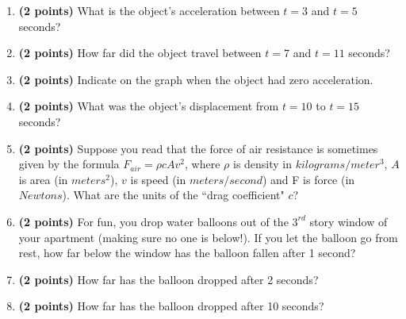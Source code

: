 \documentclass[10pt]{article}
\begin{document}
\begin{enumerate}

\item \textbf{(2 points)}
What is the object's acceleration between $t=3$ and $t=5$ seconds?

\vspace{2cm}

\item \textbf{(2 points)}
How far did the object travel between $t=7$ and $t=11$ seconds?
\vspace{2cm}

\item \textbf{(2 points)}
Indicate on the graph when the object had zero acceleration.

\item \textbf{(2 points)}
What was the object's displacement from $t=10$ to $t=15$ seconds?




\newpage
\item \textbf{(2 points)}
Suppose you read that the force of air resistance is sometimes given by the formula $F_{air}=\rho c A v^2$, where $\rho$ is density in $kilograms/meter^3$, $A$ is area (in $meters^2$), $v$ is speed (in $meters/second$) and F is force (in $Newtons$).  What are the units of the ``drag coefficient" $c$?

\vspace{3cm}


\item \textbf{(2 points)}
For fun, you drop water balloons out of the $3^{rd}$ story window of your apartment (making sure no one is below!).  If you let the balloon go from rest, how far below the window has the balloon fallen after 1 second?

\vspace{2cm}

\item \textbf{(2 points)}
How far has the balloon dropped after 2 seconds?

\vspace{2cm}

\item \textbf{(2 points)}
How far has the balloon dropped after 10 seconds?
   

\end{enumerate}
\end{document}
